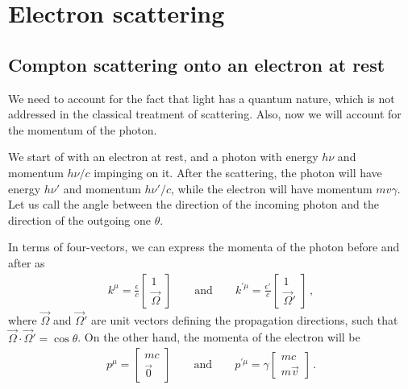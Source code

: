 \documentclass[main.tex]{subfiles}
\begin{document}
\section{Electron scattering}

\subsection{Compton scattering onto an electron at rest}


We need to account for the fact that light has a quantum nature, which is not addressed in the classical treatment of scattering. 
Also, now we will account for the momentum of the photon. 

We start of with an electron at rest, and a photon with energy \(h \nu \) and momentum \(h \nu / c\) impinging on it. 
After the scattering, the photon will have energy \(h \nu '\) and momentum \(h \nu ' / c\), while the electron will have momentum \(m v \gamma \). 
Let us call the angle between the direction of the incoming photon and the direction of the outgoing one \(\theta \). 

In terms of four-vectors, we can express the momenta of the photon before and after as 
%
\begin{align}
k^{\mu } = \frac{\epsilon}{c} \left[\begin{array}{c}
1 \\ 
\vec{\Omega}
\end{array}\right]
\qquad \text{and} \qquad
k^{\prime \mu } = \frac{\epsilon'}{c} \left[\begin{array}{c}
1 \\ 
\vec{\Omega}'
\end{array}\right]
\,,
\end{align}
%
where \(\vec{\Omega}\) and \(\vec{\Omega}'\) are unit vectors defining the propagation directions, such that \(\vec{\Omega} \cdot \vec{\Omega}' = \cos \theta \). 
On the other hand, the momenta of the electron will be 
%
\begin{align}
p^{\mu }  = \left[\begin{array}{c}
mc \\ 
\vec{0}
\end{array}\right]
\qquad \text{and} \qquad
p^{\prime \mu } = \gamma \left[\begin{array}{c}
mc \\ 
m \vec{v}
\end{array}\right]
\,.
\end{align}
\end{document}
